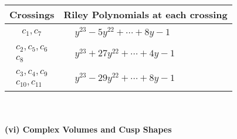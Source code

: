 \documentclass[1p]{elsarticle_modified}
\theoremstyle{definition}
\begin{document}
\begin{tabular}{m{50pt}|m{274pt}}
Crossings & \hspace{64pt}Riley Polynomials at each crossing \\
\hline $$\begin{aligned}c_{1},c_{7}\end{aligned}$$&$\begin{aligned}
&y^{23}-5 y^{22}+\cdots+8 y-1
\end{aligned}$\\
\hline $$\begin{aligned}c_{2},c_{5},c_{6}\\c_{8}\end{aligned}$$&$\begin{aligned}
&y^{23}+27 y^{22}+\cdots+4 y-1
\end{aligned}$\\
\hline $$\begin{aligned}c_{3},c_{4},c_{9}\\c_{10},c_{11}\end{aligned}$$&$\begin{aligned}
&y^{23}-29 y^{22}+\cdots+8 y-1
\end{aligned}$\\
\hline
\end{tabular}\\~\\
\newpage\flushleft \textbf{(vi) Complex Volumes and Cusp Shapes}
\end{document}
